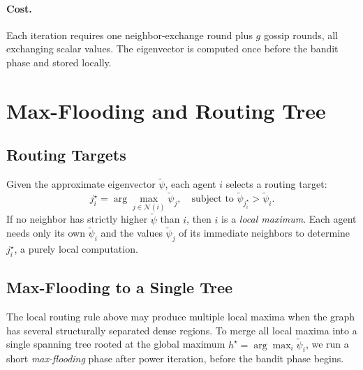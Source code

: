 \documentclass{article}
\begin{document}
\paragraph{Cost.} Each iteration requires one neighbor-exchange round plus $g$ gossip rounds, all exchanging scalar values. The eigenvector is computed once before the bandit phase and stored locally.

\section{Max-Flooding and Routing Tree}
\label{app:flooding}

\subsection{Routing Targets}

Given the approximate eigenvector $\tilde{\psi}$, each agent $i$ selects a routing target:
\[
j_i^\star = \arg\max_{j \in \mathcal{N}(i)} \tilde{\psi}_j, \quad \text{subject to } \tilde{\psi}_{j_i^\star} > \tilde{\psi}_i.
\]
If no neighbor has strictly higher $\tilde{\psi}$ than $i$, then $i$ is a \emph{local maximum}. Each agent needs only its own $\tilde{\psi}_i$ and the values $\tilde{\psi}_j$ of its immediate neighbors to determine $j_i^\star$, a purely local computation.

\subsection{Max-Flooding to a Single Tree}

The local routing rule above may produce multiple local maxima when the graph has several structurally separated dense regions. To merge all local maxima into a single spanning tree rooted at the global maximum $h^\star = \arg\max_i \tilde{\psi}_i$, we run a short \emph{max-flooding} phase after power iteration, before the bandit phase begins.
\end{document}
